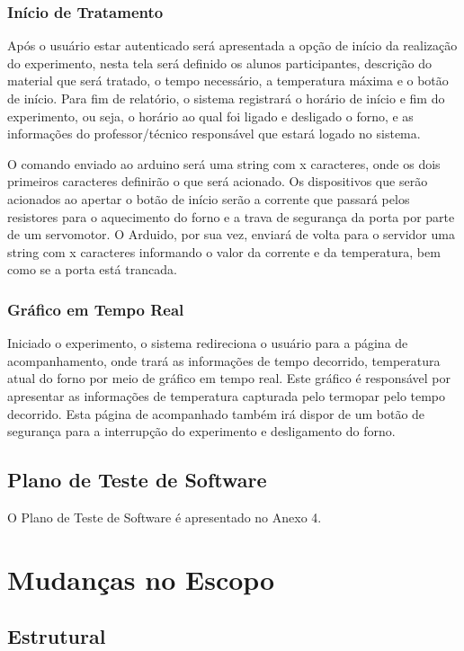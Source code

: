 \subsubsection{Início de Tratamento}
Após o usuário estar autenticado será apresentada a opção de início da realização do experimento, nesta tela será definido os alunos participantes, descrição do material que será tratado, o tempo necessário, a temperatura máxima e o botão de início. Para fim de relatório, o sistema registrará o horário de início e fim do experimento, ou seja, o horário ao qual foi ligado e desligado o forno, e as informações do professor/técnico responsável que estará logado no sistema.

O comando enviado ao arduino será uma string com x caracteres, onde os dois primeiros caracteres definirão o que será acionado. Os dispositivos que serão acionados ao apertar o botão de início serão a corrente que passará pelos resistores para o aquecimento do forno e a trava de segurança da porta por parte de um servomotor. O Arduido, por sua vez, enviará de volta para o servidor uma string com x caracteres informando o valor da corrente e da temperatura, bem como se a porta está trancada.

\subsubsection{Gráfico em Tempo Real}
Iniciado o experimento, o sistema redireciona o usuário para a página de acompanhamento, onde trará as informações de tempo decorrido, temperatura atual do forno por meio de gráfico em tempo real. Este gráfico é responsável por apresentar as informações de temperatura capturada pelo termopar pelo tempo decorrido. Esta página de acompanhado também irá dispor de um botão de segurança para a interrupção do experimento e desligamento do forno.

\subsection{Plano de Teste de Software}
O Plano de Teste de Software é apresentado no Anexo 4.

\section{Mudanças no Escopo}
\subsection{Estrutural}
